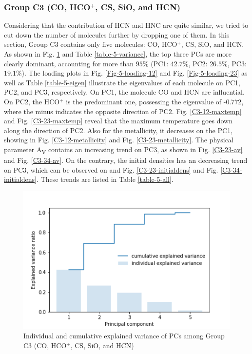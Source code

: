 \documentclass{aa}
\begin{document}
\begin{CJK*}{UTF8}{gbsn}
   
\subsubsection{Group C3 (CO, HCO$^+$, CS, SiO, and HCN)}

   Considering that the contribution of HCN and HNC are quite similar, we tried to cut down the number of molecules further by dropping one of them. 
   In this section, Group C3 contains only five molecules: CO, HCO$^+$, CS, SiO, and HCN. 
   As shown in Fig. \ref{Fig-5-variance} and Table \ref{table-5-variance}, the top three PCs are more clearly dominant, accounting for more than $95\%$ (PC1: $42.7\%$, PC2: $26.5\%$, PC3: $19.1\%$). 
   The loading plots in Fig. \ref{Fig-5-loading-12} and Fig. \ref{Fig-5-loading-23} as well as Table \ref{table-5-eigen} illustrate the eigenvalues of each molecule on PC1, PC2, and PC3, respectively. 
   On PC1, the molecule CO and HCN are influential. On PC2, the HCO$^+$ is the predominant one, possessing the eigenvalue of -0.772, where the minus indicates the opposite direction of PC2. 
   Fig. \ref{C3-12-maxtemp} and Fig. \ref{C3-23-maxtemp} reveal that the maximum temperature goes down along the direction of PC2. 
   Also for the metallicity, it decreases on the PC1, showing in Fig. \ref{C3-12-metallicity} and Fig. \ref{C3-23-metallicity}. 
   The physical parameter A\textsubscript{V} contains an increasing trend on PC3, as shown in Fig. \ref{C3-23-av} and Fig. \ref{C3-34-av}. 
   On the contrary, the initial densities has an decreasing trend on PC3, which can be observed on and Fig. \ref{C3-23-initialdens} and Fig. \ref{C3-34-initialdens}. 
   These trends are listed in Table \ref{table-5-all}. 
   
  \begin{figure}[htbp]
   \centering
   \captionsetup{justification=centering}
   \includegraphics[angle=0,scale = 0.6]{5/explained_variance_ratio.png}
   \caption{Individual and cumulative explained variance of PCs among Group C3 (CO, HCO$^+$, CS, SiO, and HCN)}
         \label{Fig-5-variance}
   \end{figure}
   

\end{CJK*}
\end{document}
